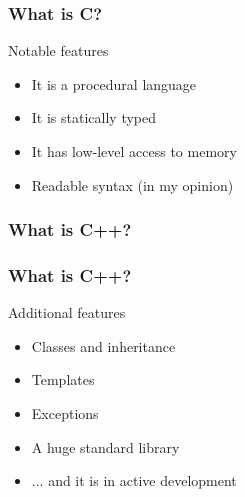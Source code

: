 \documentclass[14pt,a4paper,dvipsnames,usenames]{beamer}
\begin{document}
\begin{frame}
  \frametitle{What is C?}

  Notable features

  \vspace{.5em}

  \begin{itemize}
    \setlength\itemsep{.5em}
    \item It is a procedural language
    \item It is statically typed
    \item It has low-level access to memory
    \item Readable syntax {\fontsize{8pt}{8pt}\selectfont{}(in my opinion)}
  \end{itemize}

\end{frame}

\begin{frame}
  \frametitle{What is C++?}


  \vspace{1em}


\end{frame}

\begin{frame}
  \frametitle{What is C++?}

  Additional features

  \vspace{.5em}

  \begin{itemize}
    \setlength\itemsep{.5em}
    \item Classes and inheritance
    \item Templates
    \item Exceptions
    \item A huge standard library
    \item ... and it is in active development
  \end{itemize}

\end{frame}
\end{document}

